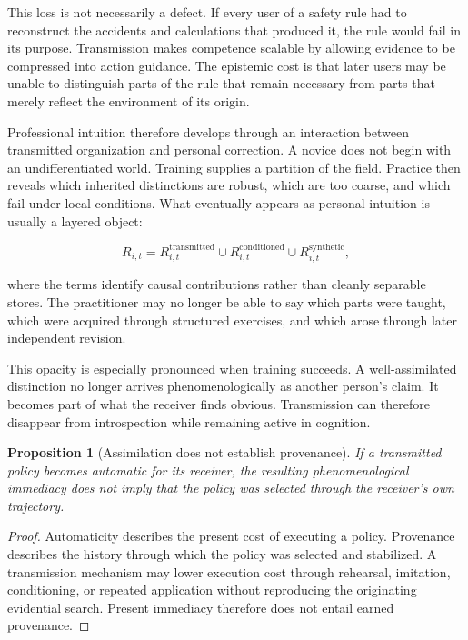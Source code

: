 \documentclass[11pt]{article}
\newtheorem{proposition}{Proposition}[section]
\begin{document}
This loss is not necessarily a defect. If every user of a safety rule had to reconstruct the accidents and calculations that produced it, the rule would fail in its purpose. Transmission makes competence scalable by allowing evidence to be compressed into action guidance. The epistemic cost is that later users may be unable to distinguish parts of the rule that remain necessary from parts that merely reflect the environment of its origin.

Professional intuition therefore develops through an interaction between transmitted organization and personal correction. A novice does not begin with an undifferentiated world. Training supplies a partition of the field. Practice then reveals which inherited distinctions are robust, which are too coarse, and which fail under local conditions. What eventually appears as personal intuition is usually a layered object:

\[
R_{i,t}
=
R_{i,t}^{\mathrm{transmitted}}
\cup
R_{i,t}^{\mathrm{conditioned}}
\cup
R_{i,t}^{\mathrm{synthetic}},
\]

where the terms identify causal contributions rather than cleanly separable stores. The practitioner may no longer be able to say which parts were taught, which were acquired through structured exercises, and which arose through later independent revision.

This opacity is especially pronounced when training succeeds. A well-assimilated distinction no longer arrives phenomenologically as another person's claim. It becomes part of what the receiver finds obvious. Transmission can therefore disappear from introspection while remaining active in cognition.

\begin{proposition}[Assimilation does not establish provenance]
If a transmitted policy becomes automatic for its receiver, the resulting phenomenological immediacy does not imply that the policy was selected through the receiver's own trajectory.
\end{proposition}

\begin{proof}
Automaticity describes the present cost of executing a policy. Provenance describes the history through which the policy was selected and stabilized. A transmission mechanism may lower execution cost through rehearsal, imitation, conditioning, or repeated application without reproducing the originating evidential search. Present immediacy therefore does not entail earned provenance.
\end{proof}
\end{document}
